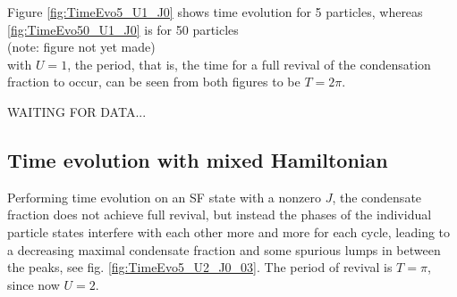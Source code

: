 Figure \ref{fig:TimeEvo5_U1_J0} shows time evolution for 5 particles, whereas \ref{fig:TimeEvo50_U1_J0} is for 50 particles \\(note: figure not yet made)\\ with $U=1$, the period, that is, the time for a full revival of the condensation fraction to occur, can be seen from both figures to be $T=2\pi$. 

WAITING FOR DATA...

\subsection{Time evolution with mixed Hamiltonian}
Performing time evolution on an SF state with a nonzero $J$, the condensate fraction does not achieve full revival, but instead the phases of the individual particle states interfere with each other more and more for each cycle, leading to a decreasing maximal condensate fraction and some spurious lumps in between the peaks, see fig. \ref{fig:TimeEvo5_U2_J0_03}. The period of revival is $T=\pi$, since now $U=2$.

